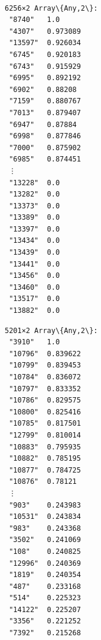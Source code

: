 \documentclass[11pt]{article}
\begin{document}
    \begin{Verbatim}[commandchars=\\\{\}]

    \end{Verbatim}

    \begin{center}
    \end{center}
    { \hspace*{\fill} \\}
    
    \begin{Verbatim}[commandchars=\\\{\}]

    \end{Verbatim}

    
    \begin{Verbatim}[commandchars=\\\{\}]
6256×2 Array\{Any,2\}:
 "8740"   1.0
 "4307"   0.973089
 "13597"  0.926034
 "6745"   0.920183
 "6743"   0.915929
 "6995"   0.892192
 "6902"   0.88208
 "7159"   0.880767
 "7013"   0.879407
 "6947"   0.87884
 "6998"   0.877846
 "7000"   0.875902
 "6985"   0.874451
 ⋮        
 "13228"  0.0
 "13282"  0.0
 "13373"  0.0
 "13389"  0.0
 "13397"  0.0
 "13434"  0.0
 "13439"  0.0
 "13441"  0.0
 "13456"  0.0
 "13460"  0.0
 "13517"  0.0
 "13882"  0.0
    \end{Verbatim}

    
    
    \begin{Verbatim}[commandchars=\\\{\}]
5201×2 Array\{Any,2\}:
 "3910"   1.0
 "10796"  0.839622
 "10799"  0.839453
 "10784"  0.836072
 "10797"  0.833352
 "10786"  0.829575
 "10800"  0.825416
 "10785"  0.817501
 "12799"  0.810014
 "10883"  0.795935
 "10882"  0.785195
 "10877"  0.784725
 "10876"  0.78121
 ⋮        
 "903"    0.243983
 "10531"  0.243834
 "983"    0.243368
 "3502"   0.241069
 "108"    0.240825
 "12996"  0.240369
 "1819"   0.240354
 "487"    0.233168
 "514"    0.225323
 "14122"  0.225207
 "3356"   0.221252
 "7392"   0.215268
    \end{Verbatim}
\end{document}
